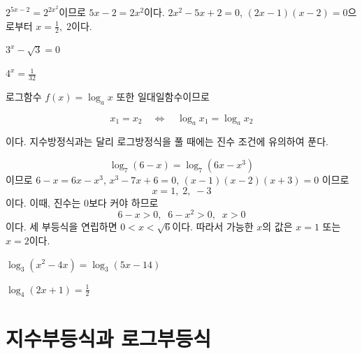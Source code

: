 \documentclass{oblivoir}
\begin{document}
%
\label{equa1}
\begin{mdframed}
\(2^{5x-2}=2^{2x^2}\)이므로 \(5x-2=2x^2\)이다.
\(2x^2-5x+2=0\), \((2x-1)(x-2)=0\)으로부터 \(x=\frac12,\;2\)이다.
\end{mdframed}

%
\label{equa2}
\begin{enumerate*}[itemjoin=\tabto{.5\textwidth}]
\item
\(3^x-\sqrt3=0\)
\item
\(4^x=\frac1{32}\)
\end{enumerate*}

\newpage
로그함수 \(f(x)=\log_ax\) 또한 일대일함수이므로
\begin{mdframed}[innertopmargin=0pt,leftmargin=.1\textwidth,rightmargin=.1\textwidth]
\[x_1=x_2\quad\Longleftrightarrow\quad \log_a{x_1}=\log_a{x_2}\]
\end{mdframed}
이다.
지수방정식과는 달리 로그방정식을 풀 때에는 진수 조건에 유의하여 푼다.

%
\label{equa3}
\begin{mdframed}
\[\log_7(6-x)=\log_7(6x-x^3)\]이므로 \(6-x=6x-x^3\), \(x^3-7x+6=0\), \((x-1)(x-2)(x+3)=0\)
이므로 \[x=1,\;2,\;-3\]이다.
이때, 진수는 0보다 커야 하므로 \[6-x>0,\;\;6-x^2>0,\;\;x>0\]이다.
세 부등식을 연립하면 \(0<x<\sqrt6\)이다.
따라서 가능한 \(x\)의 값은 \(x=1\) 또는 \(x=2\)이다.
\end{mdframed}

%
\label{equa4}
\begin{enumerate*}[itemjoin=\tabto{.5\textwidth}]
\item
\(\log_3(x^2-4x)=\log_3(5x-14)\)
\item
\(\log_4(2x+1)=\frac12\)
\end{enumerate*}

\newpage
\section{지수부등식과 로그부등식}
\end{document}
